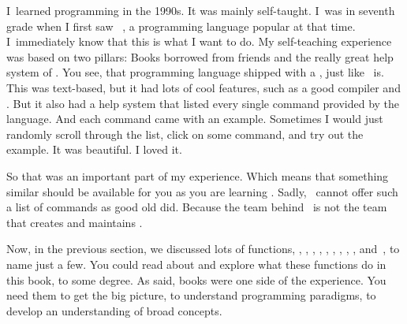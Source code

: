%
\label{sec:pythonDocumentation}%
%
I~learned programming in the 1990s.
It was mainly self-taught.
I~was in seventh grade when I first saw ~\cite{B1992TPV7UB}, a programming language popular at that time.
I~immediately know that this is what I want to do.
My self-teaching experience was based on two pillars:
Books borrowed from friends and the really great help system of .
You see, that programming language shipped with a , just like \pycharm\ is.
This  was text-based, but it had lots of cool features, such as a good compiler and .
But it also had a help system that listed every single command provided by the language.
And each command came with an example.
Sometimes I would just randomly scroll through the list, click on some command, and try out the example.
It was beautiful.
I loved it.

So that was an important part of my experience.
Which means that something similar should be available for you as you are learning \python.
Sadly, \pycharm\ cannot offer such a list of commands as good old  did.
Because the team behind \pycharm\ is not the team that creates and maintains \python.

Now, in the previous section, we discussed lots of functions, , , , , , , , , , and~, to name just a few.
You could read about and explore what these functions do in this book, to some degree.
As said, books were one side of the experience.
You need them to get the big picture, to understand programming paradigms, to develop an understanding of broad concepts.

